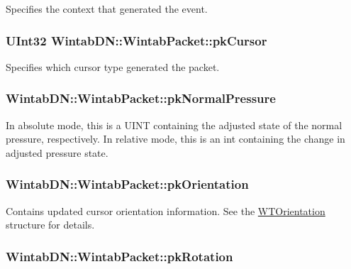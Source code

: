Specifies the context that generated the event. 

\hypertarget{struct_wintab_d_n_1_1_wintab_packet_afb9d197243879d81f43b1aaa482507ef}{
\subsubsection[{pkCursor}]{\setlength{\rightskip}{0pt plus 5cm}UInt32 {\bf WintabDN::WintabPacket::pkCursor}}}
\label{struct_wintab_d_n_1_1_wintab_packet_afb9d197243879d81f43b1aaa482507ef}


Specifies which cursor type generated the packet. 

\hypertarget{struct_wintab_d_n_1_1_wintab_packet_a4a3d1c8e15c8ea7c933a3819608ec102}{
\subsubsection[{pkNormalPressure}]{ {\bf WintabDN::WintabPacket::pkNormalPressure}}}
\label{struct_wintab_d_n_1_1_wintab_packet_a4a3d1c8e15c8ea7c933a3819608ec102}


In absolute mode, this is a UINT containing the adjusted state of the normal pressure, respectively. In relative mode, this is an int containing the change in adjusted pressure state. 

\hypertarget{struct_wintab_d_n_1_1_wintab_packet_a75a992e71d4c430f5eb5211e19ca1b32}{
\subsubsection[{pkOrientation}]{ {\bf WintabDN::WintabPacket::pkOrientation}}}
\label{struct_wintab_d_n_1_1_wintab_packet_a75a992e71d4c430f5eb5211e19ca1b32}


Contains updated cursor orientation information. See the \hyperlink{struct_wintab_d_n_1_1_w_t_orientation}{WTOrientation} structure for details. 

\hypertarget{struct_wintab_d_n_1_1_wintab_packet_a8a5d64f55e6bfb5ec4d73c842b307876}{
\subsubsection[{pkRotation}]{ {\bf WintabDN::WintabPacket::pkRotation}}}
\label{struct_wintab_d_n_1_1_wintab_packet_a8a5d64f55e6bfb5ec4d73c842b307876}


